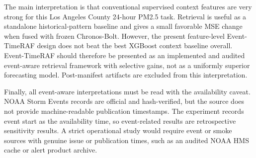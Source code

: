 The main interpretation is that conventional supervised context features are
very strong for this Los Angeles County 24-hour PM2.5 task. Retrieval is useful
as a standalone historical-pattern baseline and gives a small favorable MSE
change when fused with frozen Chronos-Bolt. However, the present feature-level
Event-TimeRAF design does not beat the best XGBoost context baseline overall.
Event-TimeRAF should therefore be presented as an implemented and audited
event-aware retrieval framework with selective gains, not as a uniformly
superior forecasting model. Post-manifest artifacts are excluded from this
interpretation.

Finally, all event-aware interpretations must be read with the availability
caveat. NOAA Storm Events records are official and hash-verified, but the source
does not provide machine-readable publication timestamps. The experiment records
event start as the availability time, so event-related results are retrospective
sensitivity results. A strict operational study would require event or smoke
sources with genuine issue or publication times, such as an audited NOAA HMS
cache or alert product archive.
